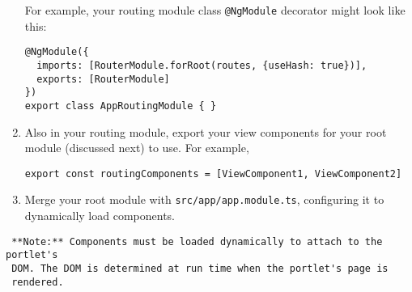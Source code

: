 \begin{enumerate}
  For example, your routing module class \texttt{@NgModule} decorator
  might look like this:

\begin{verbatim}
@NgModule({
  imports: [RouterModule.forRoot(routes, {useHash: true})],
  exports: [RouterModule]
})
export class AppRoutingModule { }
\end{verbatim}
\item
  Also in your routing module, export your view components for your root
  module (discussed next) to use. For example,

\begin{verbatim}
export const routingComponents = [ViewComponent1, ViewComponent2]
\end{verbatim}
\item
  Merge your root module with \texttt{src/app/app.module.ts},
  configuring it to dynamically load components.
\end{enumerate}

\noindent\hrulefill

\begin{verbatim}
 **Note:** Components must be loaded dynamically to attach to the portlet's
 DOM. The DOM is determined at run time when the portlet's page is
 rendered. 
\end{verbatim}

\noindent\hrulefill

